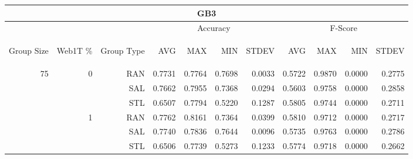 \begin{center}
\begin{table}[htbp] 
 \begin{center}
\begin{tabular}{ | r | r | r | r | r | r | r | r | r | r | r |}
\hline
\multicolumn{11}{|c|}{GB3}\\
\hline
 & & & \multicolumn{4}{|c|}{Accuracy} & \multicolumn{4}{|c|}{F-Score}\\ \cline{4-11}
\begin{sideways}Group Size\end{sideways} & \begin{sideways}Web1T \%\end{sideways} & \begin{sideways}Group Type\end{sideways} & \begin{sideways}AVG\end{sideways} & \begin{sideways}MAX\end{sideways} & \begin{sideways}MIN\end{sideways} & \begin{sideways}STDEV\end{sideways} & \begin{sideways}AVG\end{sideways} & \begin{sideways}MAX\end{sideways} & \begin{sideways}MIN\end{sideways} & \begin{sideways}STDEV\end{sideways}\\
\hline
\multirow{12}{*}{75}
 & \multirow{3}{*}{0} & RAN & 0.7731 & 0.7764 & 0.7698 & 0.0033 & 0.5722 & 0.9870 & 0.0000 & 0.2775\\ \cline{3-11}
 &   & SAL & 0.7662 & 0.7955 & 0.7368 & 0.0294 & 0.5603 & 0.9758 & 0.0000 & 0.2858\\ \cline{3-11}
 &   & STL & 0.6507 & 0.7794 & 0.5220 & 0.1287 & 0.5805 & 0.9744 & 0.0000 & 0.2711\\ \cline{2-11}
 & \multirow{3}{*}{1} & RAN & 0.7762 & 0.8161 & 0.7364 & 0.0399 & 0.5810 & 0.9712 & 0.0000 & 0.2717\\ \cline{3-11}
 &   & SAL & 0.7740 & 0.7836 & 0.7644 & 0.0096 & 0.5735 & 0.9763 & 0.0000 & 0.2786\\ \cline{3-11}
 &   & STL & 0.6506 & 0.7739 & 0.5273 & 0.1233 & 0.5774 & 0.9718 & 0.0000 & 0.2662\\ \cline{2-11}

\end{tabular}
\end{center}
\end{table}
\end{center}
